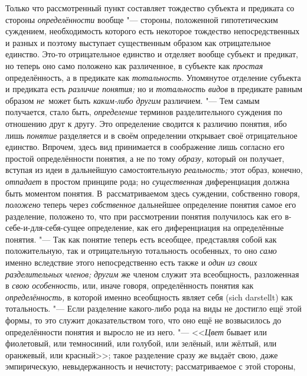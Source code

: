 Только что рассмотренный пункт составляет тождество субъекта и
предиката со стороны {\em определённости}
вообще "--- стороны, положенной гипотетическим
суждением, необходимость которого есть некоторое тождество непосредственных
и разных и поэтому выступает существенным образом как отрицательное
единство. Это-то отрицательное единство и отделяет вообще субъект и
предикат, но теперь оно само положено как различенное, в субъекте как
{\em простая} определённость, а в предикате как {\em тотальность}.
Упомянутое отделение субъекта и предиката есть {\em различие понятия;}
но и {\em тотальность видов} в предикате равным образом {\em не}~может быть
{\em каким-либо другим} различием. "--- Тем самым получается, стало быть,
{\em определение} терминов разделительного суждения по отношению друг к другу.
Это определение сводится к различию понятия, ибо лишь {\em понятие} разделяется
и в своём определении открывает своё отрицательное единство. Впрочем, здесь
вид принимается в соображение лишь согласно его простой определённости
понятия, а не по тому {\em образу,} который он получает, вступая из идеи
в дальнейшую самостоятельную {\em реальность;} этот образ, конечно,
{\em отпадает} в простом принципе рода; но {\em существенная}
диференциация должна быть моментом понятия. В~рассматриваемом здесь
суждении, собственно говоря, {\em положено} теперь через {\em собственное}
дальнейшее определение понятия самое его разделение, положено
то, что при рассмотрении понятия получилось как его в-себе-и-для-себя-сущее
определение, как его диференциация на определённые понятия. "---
Так как понятие теперь есть всеобщее, представляя собой как
положительную, так и отрицательную тотальность особенных, то оно
{\em само} именно вследствие этого непосредственно есть также и
{\em один из своих разделительных членов;} {\em другим} же
членом служит эта всеобщность, разложенная в {\em свою особенность,}
или, иначе говоря, определённость понятия как {\em определённость,} в
которой именно всеобщность являет себя (sich darstellt) как
тотальность. "--- Если разделение какого-либо рода на виды не
достигло ещё этой формы, то это служит доказательством того, что оно ещё не
возвысилось до определённости понятия и выросло не из него. "---
<<{\em Цвет} бывает или фиолетовый, или темносиний, или голубой, или
зелёный, или жёлтый, или оранжевый, или красный>>;
такое разделение сразу же выдаёт свою, даже
эмпирическую, невыдержанность и нечистоту; рассматриваемое с этой стороны,
